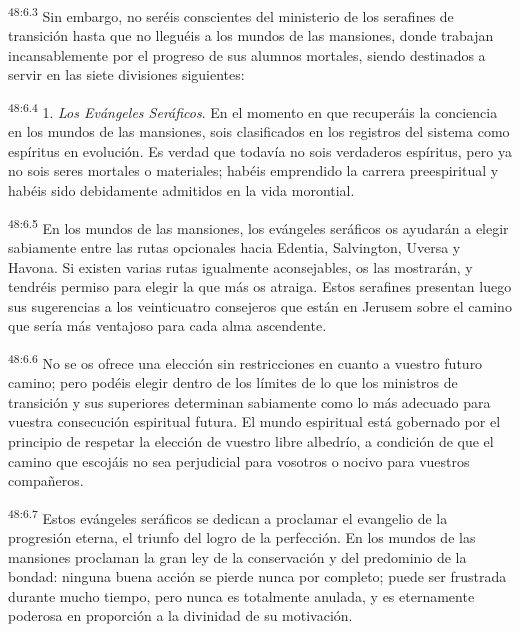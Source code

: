 \par
\textsuperscript{48:6.3} Sin embargo, no seréis conscientes del ministerio de los serafines de transición hasta que no lleguéis a los mundos de las mansiones, donde trabajan incansablemente por el progreso de sus alumnos mortales, siendo destinados a servir en las siete divisiones siguientes:

\par
\textsuperscript{48:6.4} 1. \textit{Los Evángeles Seráficos}. En el momento en que recuperáis la conciencia en los mundos de las mansiones, sois clasificados en los registros del sistema como espíritus en evolución. Es verdad que todavía no sois verdaderos espíritus, pero ya no sois seres mortales o materiales; habéis emprendido la carrera preespiritual y habéis sido debidamente admitidos en la vida morontial.

\par
\textsuperscript{48:6.5} En los mundos de las mansiones, los evángeles seráficos os ayudarán a elegir sabiamente entre las rutas opcionales hacia Edentia, Salvington, Uversa y Havona. Si existen varias rutas igualmente aconsejables, os las mostrarán, y tendréis permiso para elegir la que más os atraiga. Estos serafines presentan luego sus sugerencias a los veinticuatro consejeros que están en Jerusem sobre el camino que sería más ventajoso para cada alma ascendente.

\par
\textsuperscript{48:6.6} No se os ofrece una elección sin restricciones en cuanto a vuestro futuro camino; pero podéis elegir dentro de los límites de lo que los ministros de transición y sus superiores determinan sabiamente como lo más adecuado para vuestra consecución espiritual futura. El mundo espiritual está gobernado por el principio de respetar la elección de vuestro libre albedrío, a condición de que el camino que escojáis no sea perjudicial para vosotros o nocivo para vuestros compañeros.

\par
\textsuperscript{48:6.7} Estos evángeles seráficos se dedican a proclamar el evangelio de la progresión eterna, el triunfo del logro de la perfección. En los mundos de las mansiones proclaman la gran ley de la conservación y del predominio de la bondad: ninguna buena acción se pierde nunca por completo; puede ser frustrada durante mucho tiempo, pero nunca es totalmente anulada, y es eternamente poderosa en proporción a la divinidad de su motivación.

